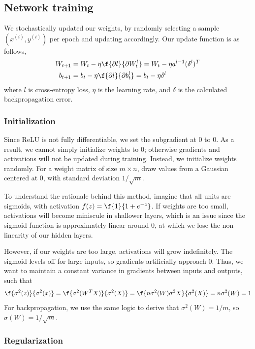\documentclass{article}
\begin{document}
\begin{multicols}{2}
\subsection{Network training}

We stochastically updated our weights,
by randomly selecting a sample $(x^{(i)}, y^{(i)})$ per epoch
and updating accordingly.
Our update function is as follows,
\begin{align}
W_{t+1} &= W_t - \eta \f{\partial l}{\partial W_t^l}
= W_t - \eta a^{l-1} (\delta^l)^T \\
b_{t+1} &= b_t - \eta \f{\partial l}{\partial b_t^l}
= b_t - \eta \delta^l
\end{align}
where $l$ is cross-entropy loss, $\eta$ is the learning rate,
and $\delta$ is the calculated backpropagation error.

\subsubsection{Initialization}

Since ReLU is not fully differentiable,
we set the subgradient at 0 to 0.
As a result, we cannot simply initialize weights to 0;
otherwise gradients and activations
will not be updated during training.
Instead, we initialize weights randomly.
For a weight matrix of size $m\times n$,
draw values from a Gaussian centered at 0,
with standard deviation $1/\sqrt{m}$.

To understand the rationale behind this method,
imagine that all units are sigmoids,
with activation $f(z) = \f{1}{1+e^{-z}}$.
If weights are too small,
activations will become miniscule in shallower layers,
which is an issue since the sigmoid function
is approximately linear around 0,
at which we lose the non-linearity of our hidden layers.

However, if our weights are too large,
activations will grow indefinitely.
The sigmoid levels off for large inputs,
so gradients artificially approach 0.
Thus, we want to maintain a constant variance in gradients between
inputs and outputs, such that
\begin{equation}
\f{\sigma^2(z)}{\sigma^2(x)} = \f{\sigma^2(W^TX)}{\sigma^2(X)}
= \f{n\sigma^2(W)\sigma^2{X}}{\sigma^2(X)} = n\sigma^2(W) = 1
\end{equation}
For backpropagation, we use the same logic to derive that
$\sigma^2(W) = 1/m$, so $\sigma(W) = 1/\sqrt{m}$.

\subsubsection{Regularization}
\label{subsubsec:1-regularize}


\end{multicols}
\end{document}
